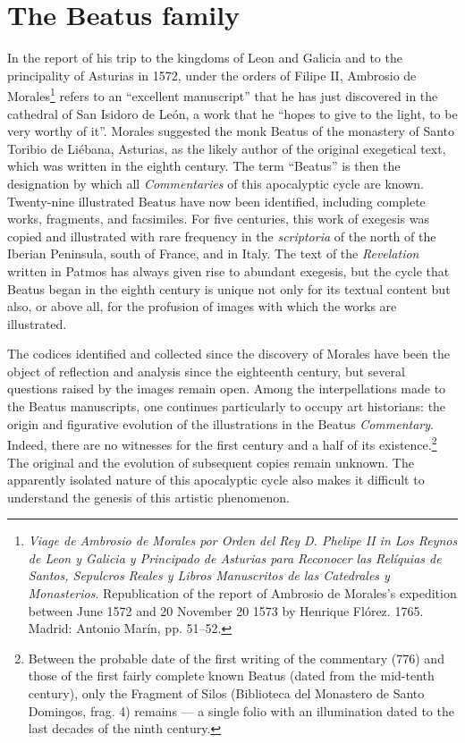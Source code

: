 \documentclass{article}
\begin{document}
\section*{The Beatus family}
In the report of his trip to the kingdoms of Leon and Galicia and to the
principality of Asturias in 1572, under the orders of Filipe II,
Ambrosio de Morales\footnote{\emph{Viage de Ambrosio de Morales por
  Orden del Rey D. Phelipe II in Los Reynos de Leon y Galicia y
  Principado de Asturias para Reconocer las Relíquias de Santos,
  Sepulcros Reales y Libros Manuscritos de las Catedrales y
  Monasterios}. Republication of the report of Ambrosio de Morales's
  expedition between June 1572 and 20 November 20 1573 by Henrique
  Flórez. 1765. Madrid: Antonio Marín, pp. 51--52.} refers to an
``excellent manuscript'' that he has just discovered in the cathedral of
San Isidoro de León, a work that he ``hopes to give to the light, to be
very worthy of it''. Morales suggested the monk Beatus of the monastery
of Santo Toribio de Liébana, Asturias, as the likely author of the
original exegetical text, which was written in the eighth century. The
term ``Beatus'' is then the designation by which all \emph{Commentaries}
of this apocalyptic cycle are known. Twenty-nine illustrated Beatus have
now been identified, including complete works, fragments, and facsimiles.
For five centuries, this work of exegesis was copied and illustrated
with rare frequency in the \emph{scriptoria} of the north of the Iberian
Peninsula, south of France, and in Italy. The text of the
\emph{Revelation} written in Patmos has always given rise to abundant
exegesis, but the cycle that Beatus began in the eighth century is
unique not only for its textual content but also, or above all, for the
profusion of images with which the works are illustrated.

The codices identified and collected since the discovery of Morales have
been the object of reflection and analysis since the eighteenth century,
but several questions raised by the images remain open. Among the
interpellations made to the Beatus manuscripts, one continues
particularly to occupy art historians: the origin and figurative
evolution of the illustrations in the Beatus \emph{Commentary}. Indeed,
there are no witnesses for the first century and a half of its
existence.\footnote{Between the probable date of the first writing of
  the commentary (776) and those of the first fairly complete known
  Beatus (dated from the mid-tenth century), only the Fragment of Silos
  (Biblioteca del Monastero de Santo Domingos, frag. 4) remains ––  a
  single folio with an illumination dated to the last decades of the
  ninth century.} The original and the evolution of subsequent copies
remain unknown. The apparently isolated nature of this apocalyptic cycle
also makes it difficult to understand the genesis of this artistic
phenomenon.
\end{document}

